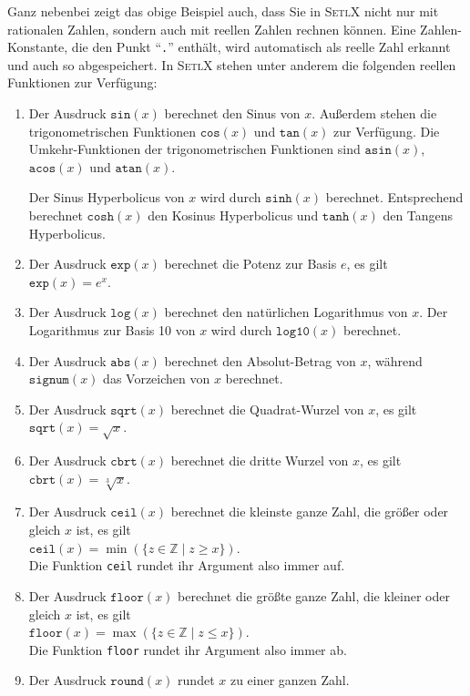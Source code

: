 Ganz nebenbei zeigt das obige Beispiel auch, dass Sie in \textsc{SetlX} nicht
nur mit rationalen Zahlen, sondern auch mit reellen Zahlen rechnen können.  Eine Zahlen-Konstante,
die den Punkt ``\texttt{.}'' enthält, wird automatisch als reelle Zahl erkannt
und auch so abgespeichert.  In \textsc{SetlX} stehen unter anderem die folgenden reellen
Funktionen zur Verfügung: 
\begin{enumerate}
\item Der Ausdruck $\texttt{sin}(x)$ berechnet den Sinus von $x$.
      Außerdem stehen die trigonometrischen Funktionen $\texttt{cos}(x)$ und 
      $\texttt{tan}(x)$ zur Verfügung. Die Umkehr-Funktionen der trigonometrischen Funktionen sind
      $\texttt{asin}(x)$, $\texttt{acos}(x)$ und $\texttt{atan}(x)$.    

      Der Sinus Hyperbolicus von $x$ wird durch $\mathtt{sinh}(x)$ berechnet. 
      Entsprechend berechnet $\mathtt{cosh}(x)$ den Kosinus Hyperbolicus und
      $\mathtt{tanh}(x)$ den Tangens Hyperbolicus.
\item Der Ausdruck $\texttt{exp}(x)$ berechnet die Potenz zur Basis $e$, es gilt
      \\[0.2cm]
      \hspace*{1.3cm}
      $\texttt{exp}(x) = e^x$.
\item Der Ausdruck $\texttt{log}(x)$ berechnet den natürlichen Logarithmus von $x$.
       Der Logarithmus zur Basis 10 von $x$ wird durch $\mathtt{log10}(x)$ berechnet.
\item Der Ausdruck $\texttt{abs}(x)$ berechnet den Absolut-Betrag von $x$, während
      $\mathtt{signum}(x)$ das Vorzeichen von $x$ berechnet.
\item Der Ausdruck $\texttt{sqrt}(x)$ berechnet die Quadrat-Wurzel von $x$, es gilt
      \\[0.2cm]
      \hspace*{1.3cm}
      $\texttt{sqrt}(x) = \sqrt{x}$.
\item Der Ausdruck $\texttt{cbrt}(x)$ berechnet die dritte Wurzel von $x$, es gilt
      \\[0.2cm]
      \hspace*{1.3cm}
      $\texttt{cbrt}(x) = \sqrt[3]{x}$.
\item Der Ausdruck $\texttt{ceil}(x)$ berechnet die kleinste ganze Zahl, die größer oder
      gleich $x$ ist, es gilt
      \\[0.2cm]
      \hspace*{1.3cm}
      $\texttt{ceil}(x) = \min(\{ z \in \mathbb{Z} \mid z \geq x \})$.
      \\[0.2cm]
      Die Funktion \texttt{ceil} rundet ihr Argument also immer auf.
\item Der Ausdruck $\texttt{floor}(x)$ berechnet die größte ganze Zahl, die kleiner oder
      gleich $x$ ist, es gilt
      \\[0.2cm]
      \hspace*{1.3cm}
      $\texttt{floor}(x) = \max(\{ z \in \mathbb{Z} \mid z \leq x \})$.
      \\[0.2cm]
      Die Funktion \texttt{floor} rundet ihr Argument also immer ab.
\item Der Ausdruck $\texttt{round}(x)$ rundet $x$ zu einer ganzen Zahl.
\end{enumerate}
